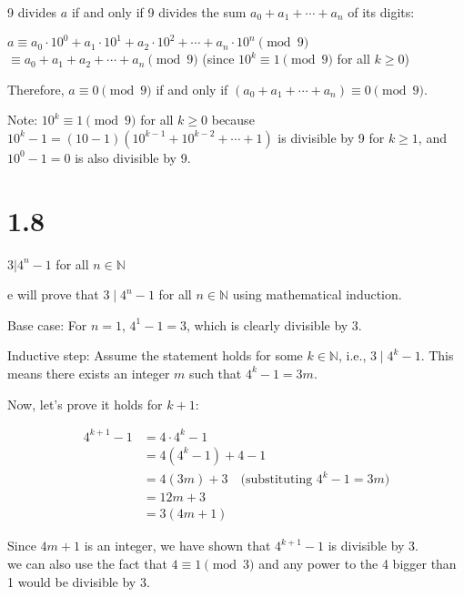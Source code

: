 \documentclass{article}
\begin{document}
\begin{solution}
9 divides $a$ if and only if 9 divides the sum $a_0 + a_1 + \cdots + a_n$ of its digits:

$a \equiv a_0 \cdot 10^0 + a_1 \cdot 10^1 + a_2 \cdot 10^2 + \cdots + a_n \cdot 10^n \pmod{9}$
$\equiv a_0 + a_1 + a_2 + \cdots + a_n \pmod{9}$ (since $10^k \equiv 1 \pmod{9}$ for all $k \geq 0$)

Therefore, $a \equiv 0 \pmod{9}$ if and only if $(a_0 + a_1 + \cdots + a_n) \equiv 0 \pmod{9}$.

Note: $10^k \equiv 1 \pmod{9}$ for all $k \geq 0$ because $10^k - 1 = (10-1)(10^{k-1} + 10^{k-2} + \cdots + 1)$ is divisible by 9 for $k \geq 1$, and $10^0 - 1 = 0$ is also divisible by 9.

\end{solution}
\section{1.8}
$3 | 4^n -1$ for all $n \in \mathbb{N} $
\begin{solution}
    e will prove that $3 \mid 4^n - 1$ for all $n \in \mathbb{N}$ using mathematical induction.

Base case: For $n = 1$,
$4^1 - 1 = 3$, which is clearly divisible by 3.

Inductive step: Assume the statement holds for some $k \in \mathbb{N}$, i.e., $3 \mid 4^k - 1$.
This means there exists an integer $m$ such that $4^k - 1 = 3m$.

Now, let's prove it holds for $k+1$:

\begin{align*}
4^{k+1} - 1 &= 4 \cdot 4^k - 1 \\
&= 4(4^k - 1) + 4 - 1 \\
&= 4(3m) + 3 \quad \text{(substituting $4^k - 1 = 3m$)} \\
&= 12m + 3 \\
&= 3(4m + 1)
\end{align*}

Since $4m + 1$ is an integer, we have shown that $4^{k+1} - 1$ is divisible by 3.
\\ we can also use the fact that $ 4 \equiv 1 \pmod{3} $ and any power to the 4 bigger than 1 would be divisible by 3.
\end{solution} 
\end{document}
